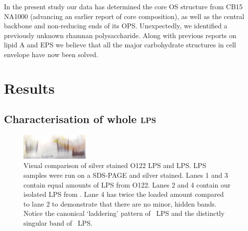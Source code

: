 In the present study our data has determined the core \ac{OS} structure from
\caulobacter CB15 NA1000 (advancing an earlier report of core
composition), as well as the central backbone and
non-reducing ends of its \ac{OPS}. Unexpectedly, we identified a previously
unknown rhamnan polysaccharide. Along with previous reports on lipid
A and \ac{EPS} we believe
that all the major carbohydrate structures in \caulobacter cell envelope have
now been solved.

\section{Results} %
\label{sec:lps_results}
	\subsection{Characterisation of whole \textsc{lps}} %
	\label{sub:characterisation_of_whole_lps}
  \begin{figure}[htb]
    \begin{center}
      \includegraphics[width=0.3\textwidth]{lps_chapter/img/lpssilverstain.jpg}
    \end{center}
    \caption[Visual comparison of \ecoli O122 \ac{LPS} and \caulobacter \ac{LPS}]{Visual comparison
      of silver stained \ecoli O122 \ac{LPS} and \caulobacter \ac{LPS}. \ac{LPS} samples were run on
      a \ac{SDS-PAGE} and silver stained. Lanes 1 and 3 contain equal amounts of \ac{LPS} from
      \ecoli O122. Lanes 2 and 4 contain our isolated \ac{LPS} from \caulobacter. Lane 4 has twice
      the loaded amount compared to lane 2 to demonstrate that there are no minor, hidden
      bands. Notice the canonical `laddering' pattern of \ecoli\ \ac{LPS} and the distinctly
      singular band of \caulobacter\ \ac{LPS}.}
    \label{fig:lpssilverstain}
  \end{figure}

